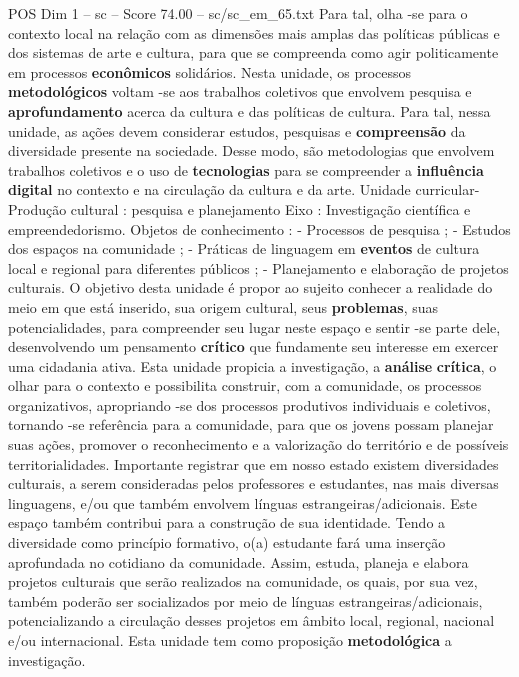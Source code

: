 \begin{textsample}{POS Dim 1 – sc – Score 74.00 – sc/sc\_em\_65.txt}
Para tal, olha -se para o contexto local na relação com as dimensões mais amplas das políticas públicas e dos sistemas de arte e cultura, para que se compreenda como agir politicamente em processos \textbf{econômicos} solidários.
Nesta unidade, os processos \textbf{metodológicos} voltam -se aos trabalhos coletivos que envolvem pesquisa e \textbf{aprofundamento} acerca da cultura e das políticas de cultura.
Para tal, nessa unidade, as ações devem considerar estudos, pesquisas e \textbf{compreensão} da diversidade presente na sociedade.
Desse modo, são metodologias que envolvem trabalhos coletivos e o uso de \textbf{tecnologias} para se compreender a \textbf{influência} \textbf{digital} no contexto e na circulação da cultura e da arte.
Unidade curricular- Produção cultural : pesquisa e planejamento Eixo : Investigação científica e empreendedorismo.
Objetos de conhecimento : - Processos de pesquisa ; - Estudos dos espaços na comunidade ; - Práticas de linguagem em \textbf{eventos} de cultura local e regional para diferentes públicos ; - Planejamento e elaboração de projetos culturais.
O objetivo desta unidade é propor ao sujeito conhecer a realidade do meio em que está inserido, sua origem cultural, seus \textbf{problemas}, suas potencialidades, para compreender seu lugar neste espaço e sentir -se parte dele, desenvolvendo um pensamento \textbf{crítico} que fundamente seu interesse em exercer uma cidadania ativa.
Esta unidade propicia a investigação, a \textbf{análise} \textbf{crítica}, o olhar para o contexto e possibilita construir, com a comunidade, os processos organizativos, apropriando -se dos processos produtivos individuais e coletivos, tornando -se referência para a comunidade, para que os jovens possam planejar suas ações, promover o reconhecimento e a valorização do território e de possíveis territorialidades.
Importante registrar que em nosso estado existem diversidades culturais, a serem consideradas pelos professores e estudantes, nas mais diversas linguagens, e/ou que também envolvem línguas estrangeiras/adicionais.
Este espaço também contribui para a construção de sua identidade.
Tendo a diversidade como princípio formativo, o(a) estudante fará uma inserção aprofundada no cotidiano da comunidade.
Assim, estuda, planeja e elabora projetos culturais que serão realizados na comunidade, os quais, por sua vez, também poderão ser socializados por meio de línguas estrangeiras/adicionais, potencializando a circulação desses projetos em âmbito local, regional, nacional e/ou internacional.
Esta unidade tem como proposição \textbf{metodológica} a investigação.

\end{textsample}
